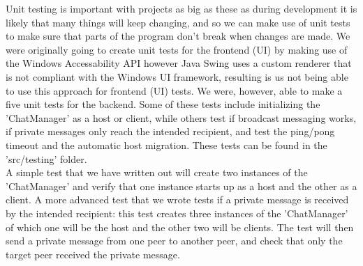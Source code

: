 \documentclass{COMPXXXX}
\begin{document}
\normalsize \textrm {Unit testing is important with projects as big as these as during development it is likely that many things will keep changing, and so we can make use of unit tests to make sure that parts of the program don't break when changes are made. We were originally going to create unit tests for the frontend (UI) by making use of the Windows Accessability API however Java Swing uses a custom renderer that is not compliant with the Windows UI framework, resulting is us not being able to use this approach for frontend (UI) tests. We were, however, able to make a five unit tests for the backend. Some of these tests include initializing the 'ChatManager' as a host or client, while others test if broadcast messaging works, if private messages only reach the intended recipient, and test the ping/pong timeout and the automatic host migration. These tests can be found in the 'src/testing' folder.\\
A simple test that we have written out will create two instances of the 'ChatManager' and verify that one instance starts up as a host and the other as a client. A more advanced test that we wrote tests if a private message is received by the intended recipient: this test creates three instances of the 'ChatManager' of which one will be the host and the other two will be clients. The test will then send a private message from one peer to another peer, and check that only the target peer received the private message.}
\end{document}
